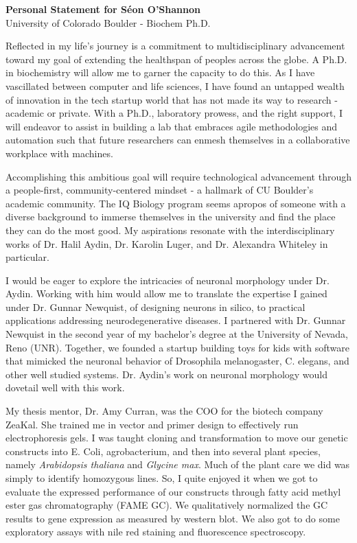 \documentclass[12pt]{article}
\begin{document}
\begin{center}
    \Large{\textbf{Personal Statement for Séon O'Shannon}} \\
    University of Colorado Boulder - Biochem Ph.D.
\end{center}

\vspace{0.5cm}

Reflected in my life's journey is a commitment to multidisciplinary advancement toward my goal of extending the healthspan of peoples across the globe. A Ph.D. in biochemistry will allow me to garner the capacity to do this. As I have vascillated between computer and life sciences, I have found an untapped wealth of innovation in the tech startup world that has not made its way to research - academic or private. With a Ph.D., laboratory prowess, and the right support, I will endeavor to assist in building a lab that embraces agile methodologies and automation such that future researchers can enmesh themselves in a collaborative workplace with machines.

Accomplishing this ambitious goal will require technological advancement through a people-first, community-centered mindset - a hallmark of CU Boulder's academic community. The IQ Biology program seems apropos of someone with a diverse background to immerse themselves in the university and find the place they can do the most good. My aspirations resonate with the interdisciplinary works of Dr. Halil Aydin, Dr. Karolin Luger, and Dr. Alexandra Whiteley in particular.

I would be eager to explore the intricacies of neuronal morphology under Dr. Aydin. Working with him would allow me to translate the expertise I gained under Dr. Gunnar Newquist, of designing neurons in silico, to practical applications addressing neurodegenerative diseases. I partnered with Dr. Gunnar Newquist in the second year of my bachelor's degree at the University of Nevada, Reno (UNR). Together, we founded a startup building toys for kids with software that mimicked the neuronal behavior of Drosophila melanogaster, C. elegans, and other well studied systems. Dr. Aydin's work on neuronal morphology would dovetail well with this work.

My thesis mentor, Dr. Amy Curran, was the COO for the biotech company ZeaKal. She trained me in vector and primer design to effectively run electrophoresis gels. I was taught cloning and transformation to move our genetic constructs into E. Coli, agrobacterium, and then into several plant species, namely \textit{Arabidopsis thaliana} and \textit{Glycine max}. Much of the plant care we did was simply to identify homozygous lines. So, I quite enjoyed it when we got to evaluate the expressed performance of our constructs through fatty acid methyl ester gas chromatography (FAME GC). We qualitatively normalized the GC results to gene expression as measured by western blot. We also got to do some exploratory assays with nile red staining and fluorescence spectroscopy.
\end{document}
